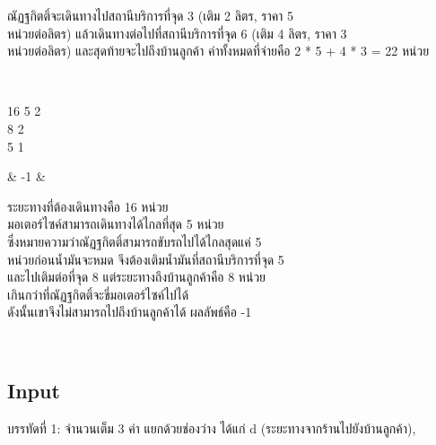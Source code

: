 \documentclass{article}
\begin{document}
{\begin{longtable}[]
\begin{minipage}[t]{\linewidth}
ณัฏฐกิตติ์จะเดินทางไปสถานีบริการที่จุด 3 (เติม 2 ลิตร, ราคา 5\\

หน่วยต่อลิตร) แล้วเดินทางต่อไปที่สถานีบริการที่จุด 6 (เติม 4 ลิตร, ราคา 3\\

หน่วยต่อลิตร) และสุดท้ายจะไปถึงบ้านลูกค้า ค่าทั้งหมดที่จ่ายคือ 2 * 5 + 4 * 3 = 22 หน่วย\\

\strut

\end{minipage} \\

\begin{minipage}[t]{\linewidth}\raggedright

16 5 2\\

8 2\\

5 1\\

\strut

\end{minipage} & -1 & \begin{minipage}[t]{\linewidth}\raggedright

ระยะทางที่ต้องเดินทางคือ 16 หน่วย\\

มอเตอร์ไซค์สามารถเดินทางได้ไกลที่สุด 5 หน่วย\\

ซึ่งหมายความว่าณัฏฐกิตติ์สามารถขับรถไปได้ไกลสุดแค่ 5\\

หน่วยก่อนน้ำมันจะหมด จึงต้องเติมน้ำมันที่สถานีบริการที่จุด 5\\

และไปเติมต่อที่จุด 8 แต่ระยะทางถึงบ้านลูกค้าคือ 8 หน่วย\\

เกินกว่าที่ณัฏฐกิตติ์จะขี่มอเตอร์ไซค์ไปได้\\

ดังนั้นเขาจึงไม่สามารถไปถึงบ้านลูกค้าได้ ผลลัพธ์คือ -1\\

\strut

\end{minipage} \\

\end{longtable}

}



\subsection*{Input}
บรรทัดที่ 1: จำนวนเต็ม 3 ค่า แยกด้วยช่องว่าง ได้แก่ d (ระยะทางจากร้านไปยังบ้านลูกค้า),
\end{document}
